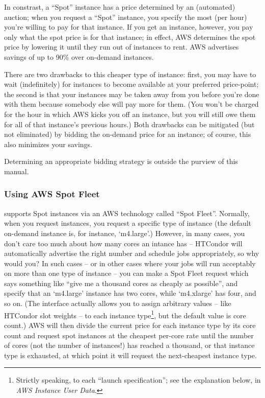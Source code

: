 In constrast, a ``Spot'' instance has a price determined by an (automated)
auction; when you request a ``Spot'' instance, you specify the most (per hour)
you're willing to pay for that instance.  If you get an instance, however,
you pay only what the spot price is for that instance; in effect, AWS
determines the spot price by lowering it until they run out of instances
to rent.  AWS advertises savings of up to 90\% over on-demand instances.

There are two drawbacks to this cheaper type of instance: first,
you may have to wait (indefinitely) for instances to become available at
your preferred price-point; the second is that your instances may be taken
away from you before you're done with them because somebody else will pay
more for them.  (You won't be charged for the hour in which AWS kicks
you off an instance, but you will still owe them for all of that instance's
previous hours.)  Both drawbacks can be mitigated (but not eliminated) by
bidding the on-demand price for an instance; of course, this also minimizes
your savings.

Determining an appropriate bidding strategy is outside the purview of
this manual.

\subsubsection{Using AWS Spot Fleet}

 supports Spot instances via an AWS technology called
``Spot Fleet''.  Normally, when you request instances, you request a specific
type of instance (the default on-demand instance is, for instance, `m4.large'.)
However, in many cases, you don't care too much about how many cores an
intance has -- HTCondor will automatically advertise the right number and
schedule jobs appropriately, so why would you?  In such cases -- or in
other cases where your jobs will run acceptably on more than one type of
instance -- you can make a Spot Fleet request which says something like
``give me a thousand cores as cheaply as possible'', and specify that
an `m4.large' instance has two cores, while `m4.xlarge' has four, and so
on.  (The interface actually allows you to assign arbitrary values --
like HTCondor slot weights -- to each instance
type\footnote{Strictly speaking, to each ``launch specification''; see
the explanation below, in \emph{AWS Instance User Data}.},
but the default value is core count.)  AWS will then divide the current price for each
instance type by its core count and request spot instances at the cheapest
per-core rate until the number of cores (not the number of instances!) has
reached a thousand, or that instance type is exhausted, at which point it will
request the next-cheapest instance type.

